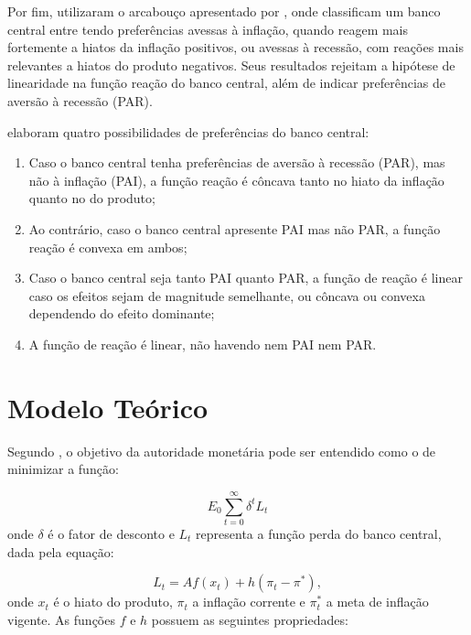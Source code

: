\documentclass[
	article,			%
	11pt,				%
	oneside,			%
	a4paper,			%
	english,			%
	brazil,				%
	]{abntex2}
\begin{document}
	Por fim,  utilizaram o arcabouço apresentado por , onde classificam um banco central entre tendo preferências avessas à inflação, quando reagem mais fortemente a hiatos da inflação positivos, ou avessas à recessão, com reações mais relevantes a hiatos do produto negativos. Seus resultados rejeitam a hipótese de linearidade na função reação do banco central, além de indicar preferências de aversão à recessão (PAR).
	
	 elaboram quatro possibilidades de preferências do banco central:
	
	\begin{enumerate}
		\item Caso o banco central tenha preferências de aversão à recessão (PAR), mas não à inflação (PAI), a função reação é côncava tanto no hiato da inflação quanto no do produto;
		\item Ao contrário, caso o banco central apresente PAI mas não PAR, a função reação é convexa em ambos;
		\item Caso o banco central seja tanto PAI quanto PAR, a função de reação é linear caso os efeitos sejam de magnitude semelhante, ou côncava ou convexa dependendo do efeito dominante;
		\item A função de reação é linear, não havendo nem PAI nem PAR.
	\end{enumerate}
	
	\section{Modelo Teórico}
	
	Segundo , o objetivo da autoridade monetária pode ser entendido como o de minimizar a função:
	
	\begin{equation}  \label{funcao_perda}
		E_0\sum_{t=0}^{\infty}\delta^t L_t
	\end{equation}
	onde $\delta$ é o fator de desconto e $L_{t}$ representa a função perda do banco central, dada pela equação:
	
	\begin{equation}
		L_t = Af(x_t) + h(\pi_t - \pi^*),
	\end{equation}
	onde $x_t$ é o hiato do produto, $\pi_t$ a inflação corrente e $\pi_t^*$ a meta de inflação vigente. As funções $f$ e $h$ possuem as seguintes propriedades:
	
\end{document}
